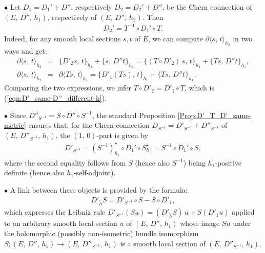 \documentclass[12pt]{article}
\begin{document}
$\bullet$ Let $D_1 = D_1' + D''$, respectively $D_2 = D_2' + D''$, be the Chern connection of $(E,\,D'',\,h_1)$, respectively of $(E,\,D'',\,h_2)$. Then \begin{eqnarray}\label{eqn:D'_same-D''_different-h}D_2' = T^{-1}\circ D_1'\circ T.\end{eqnarray} Indeed, for any smooth local sections $s,t$ of $E$, we can compute $\partial\langle s,\,t\rangle_{h_2}$ in two ways and get: \begin{eqnarray*}\partial\langle s,\,t\rangle_{h_2} & = & \{D'_2s,\,t\}_{h_2} + \{s,\,D''t\}_{h_2} = \{(T\circ D'_2)\,s,\,t\}_{h_1} + \{Ts,\,D''t\}_{h_1},\\
 \partial\langle s,\,t\rangle_{h_2} & = & \partial\langle Ts,\,t\rangle_{h_1} = \{D'_1(Ts),\,t\}_{h_1} + \{Ts,\,D''t\}_{h_1}.\end{eqnarray*} Comparing the two expressions, we infer $T\circ D'_2 = D'_1\circ T$, which is (\ref{eqn:D'_same-D''_different-h}).

$\bullet$ Since $D''_{S^{-1}}=S\circ D''\circ S^{-1}$, the standard Proposition \ref{Prop:D'_T_D'_same-metric} ensures that, for the Chern connection $D_{S^{-1}} = D'_{S^{-1}} + D''_{S^{-1}}$ of $(E,\,D''_{S^{-1}},\,h_1)$, the $(1,\,0)$-part is given by \begin{eqnarray}\label{eqn:D'_S-1_D'_1}D'_{S^{-1}} = (S^{-1})^\star_{h_1}\circ D_1'\circ S^\star_{h_1} = S^{-1}\circ D_1'\circ S,\end{eqnarray} where the second equality follows from $S$ (hence also $S^{-1}$) being $h_1$-positive definite (hence also $h_1$-self-adjoint).

$\bullet$ A link between these objects is provided by the formula: \begin{eqnarray}\label{eqn:D'_h-tilde_D'_S-1_formula}D'_{\widetilde{h}}S = D'_{S^{-1}}\circ S - S\circ D'_1,\end{eqnarray} which expresses the Leibniz rule $D'_{S^{-1}}(Su) = (D'_{\widetilde{h}}S)\,u + S(D'_1u)$ applied to an arbitrary smooth local section $u$ of $(E,\,D'',\,h_1)$ whose image $Su$ under the holomorphic (possibly non-isometric) bundle isomorphism $S:(E,\,D'',\,h_1)\longrightarrow(E,\,D''_{S^{-1}},\,h_1)$ is a smooth local section of $(E,\,D''_{S^{-1}},\,h_1)$.  
\end{document}
